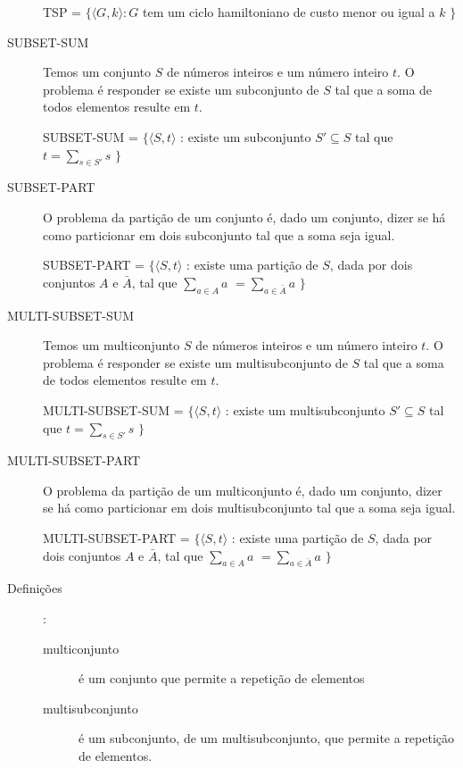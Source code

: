 \documentclass[12pt]{article}
\begin{document}
\begin{description}
TSP = $\{\langle G, k\rangle : G$ tem um ciclo hamiltoniano de custo menor ou igual a $k$ $\}$

\item[SUBSET-SUM]

Temos um conjunto $S$ de números inteiros e um número inteiro $t$. O problema é responder se existe um subconjunto de $S$ tal que a soma de todos elementos resulte em $t$.

SUBSET-SUM = $\{\langle S,t\rangle$ : existe um subconjunto $S'\subseteq S$ tal que $t = \sum_{s\in S'}s$ $\}$

\item[SUBSET-PART]

O problema da partição de um conjunto é, dado um conjunto, dizer se há como particionar em dois subconjunto tal que a soma seja igual.

SUBSET-PART = $\{\langle S,t\rangle$ : existe uma partição de $S$, dada por dois conjuntos $A$ e $\bar{A}$, tal que $\sum_{a\in A}a$ $ = \sum_{a\in \bar{A}} a$ $\}$

\item[MULTI-SUBSET-SUM]

Temos um multiconjunto $S$ de números inteiros e um número inteiro $t$. O problema é responder se existe um multisubconjunto de $S$ tal que a soma de todos elementos resulte em $t$.

MULTI-SUBSET-SUM = $\{\langle S,t\rangle$ : existe um multisubconjunto $S'\subseteq S$ tal que $t = \sum_{s\in S'}s$ $\}$

\item[MULTI-SUBSET-PART]

O problema da partição de um multiconjunto é, dado um conjunto, dizer se há como particionar em dois multisubconjunto tal que a soma seja igual.

MULTI-SUBSET-PART = $\{\langle S,t\rangle$ : existe uma partição de $S$, dada por dois conjuntos $A$ e $\bar{A}$, tal que $\sum_{a\in A}a$ $ = \sum_{a\in \bar{A}} a$ $\}$

\item[Definições]:

\begin{description}

\item[multiconjunto] é um conjunto que permite a repetição de elementos

\item[multisubconjunto] é um subconjunto, de um multisubconjunto, que permite a repetição de elementos.

\end{description}


\end{description}
\end{document}
